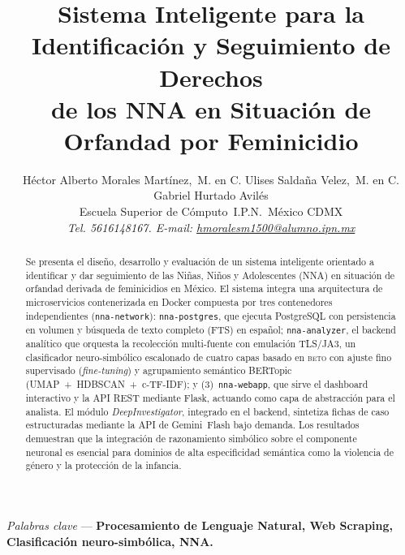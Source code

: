 \documentclass[conference]{IEEEtran}
\newcommand{\BETO}{\textsc{beto}}
\newcommand{\NNA}{NNA}
\begin{document}
\title{\large\bfseries Sistema Inteligente para la Identificación y Seguimiento
       de Derechos\\de los NNA en Situación de Orfandad por Feminicidio}


\author{%
  Héctor Alberto Morales Martínez,\ M. en C. Ulises Saldaña Velez,\ M. en C. Gabriel Hurtado Avilés\\
  Escuela Superior de Cómputo\ I.P.N.\ México CDMX\\
  \textit{Tel. 5616148167. E-mail: \href{mailto:hmoralesm1500@alumno.ipn.mx}{hmoralesm1500@alumno.ipn.mx}}%
}
 
\maketitle

\begin{abstract}
Se presenta el diseño, desarrollo y evaluación de un sistema inteligente
orientado a identificar y dar seguimiento de las Niñas, Niños y Adolescentes
(\NNA{}) en situación de orfandad derivada de feminicidios en México. El
sistema integra una arquitectura de microservicios contenerizada en Docker
compuesta por tres contenedores independientes (\texttt{nna-network}):
\texttt{nna-postgres}, que ejecuta PostgreSQL con persistencia en volumen y
búsqueda de texto completo (FTS) en español; \texttt{nna-analyzer}, el backend
analítico que orquesta la recolección multi-fuente con emulación TLS/JA3,
un clasificador neuro-simbólico escalonado de cuatro capas basado en \BETO{}
con ajuste fino supervisado (\textit{fine-tuning}) y agrupamiento semántico BERTopic
(UMAP~+~HDBSCAN~+~c-TF-IDF); y (3)~\texttt{nna-webapp}, que sirve el
dashboard interactivo y la API REST mediante Flask, actuando como capa
de abstracción para el analista. El módulo \textit{DeepInvestigator},
integrado en el backend, sintetiza fichas de caso estructuradas
mediante la API de Gemini~Flash bajo demanda. Los resultados demuestran que
la integración de razonamiento simbólico sobre el componente neuronal es
esencial para dominios de alta especificidad semántica como la violencia de
género y la protección de la infancia.
\end{abstract}

\vspace{0.5em}
\noindent\textit{Palabras clave} --- \textbf{Procesamiento de Lenguaje Natural,
Web Scraping, Clasificación neuro-simbólica, NNA.}
\end{document}
